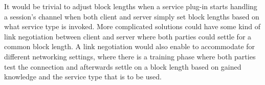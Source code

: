 It would be trivial to adjust block lengths when a service plug-in starts handling a session's channel when both client and server simply set block lengths based on what service type is invoked.
More complicated solutions could have some kind of link negotiation between client and server where both parties could settle for a common block length.
A link negotiation would also enable to accommodate for different networking settings, where there is a training phase where both parties test the connection and afterwards settle on a block length based on gained knowledge and the service type that is to be used.


